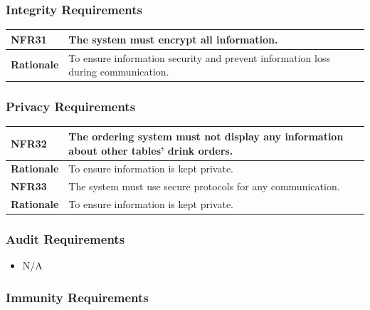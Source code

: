 \documentclass [11pt]{article}
\begin{document}
\subsubsection{Integrity Requirements }

\begin{longtable}{| p{ } | p{ } | }\hline 
\rowcolor{tableCell}\textbf{NFR31} & The system must encrypt all information.\\ \hline
\textbf{Rationale} &  To ensure information security and prevent information loss during communication.\\ \hline
\end{longtable}

\subsubsection{Privacy Requirements }

\begin{longtable}{| p{ } | p{ } | }\hline 
\rowcolor{tableCell}\textbf{NFR32} & The ordering system must not display any information about other tables' drink orders.\\ \hline
\textbf{Rationale} &  To ensure information is kept private.\\ \hline 
\rowcolor{tableCell}\textbf{NFR33} & The system must use secure protocols for any communication. \\ \hline
\textbf{Rationale} &  To ensure information is kept private.\\ \hline 
\end{longtable}

\subsubsection{Audit  Requirements}
	
	\begin{itemize}
		\item N/A
	\end{itemize} 

\subsubsection{Immunity Requirements}
\end{document}
